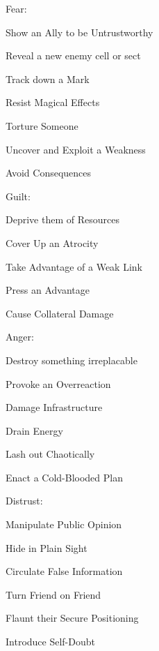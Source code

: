 \documentclass[
  oneside,
  statementpaper,
  9pt]{memoir}
\begin{document}
\begin{MC}
\begin{itemize*}
\end{itemize*}

Fear:

\begin{itemize*}

\item Show an Ally to be Untrustworthy 
\item Reveal a new enemy cell or sect 
\item Track down a Mark 
\item Resist Magical Effects 
\item Torture Someone 
\item Uncover and Exploit a Weakness 
\item Avoid Consequences

\end{itemize*}

Guilt:

\begin{itemize*}

\item Deprive them of Resources 
\item Cover Up an Atrocity 
\item Take Advantage of a Weak Link 
\item Press an Advantage 
\item Cause Collateral Damage 

\end{itemize*}

Anger:

\begin{itemize*}

\item Destroy something irreplacable 
\item Provoke an Overreaction 
\item Damage Infrastructure 
\item Drain Energy 
\item Lash out Chaotically 
\item Enact a Cold-Blooded Plan 

\end{itemize*}

Distrust:

\begin{itemize*}

\item Manipulate Public Opinion 
\item Hide in Plain Sight 
\item Circulate False Information 
\item Turn Friend on Friend 
\item Flaunt their Secure Positioning 
\item Introduce Self-Doubt


\end{itemize*}
\end{MC}
\end{document}
